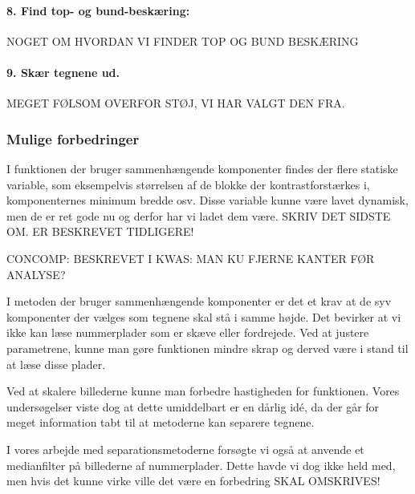 \paragraph{8. Find top- og bund-beskæring:}
NOGET OM HVORDAN VI FINDER TOP OG BUND BESKÆRING

\paragraph{9. Skær tegnene ud.}


MEGET FØLSOM OVERFOR STØJ, VI HAR VALGT DEN FRA.


\subsubsection{Mulige forbedringer}

I funktionen der bruger sammenhængende komponenter findes der flere statiske variable, som eksempelvis størrelsen af de blokke der kontrastforstærkes i, komponenternes minimum bredde osv. Disse variable kunne være lavet dynamisk, men de er ret gode nu og derfor har vi ladet dem være. SKRIV DET SIDSTE OM. ER BESKREVET TIDLIGERE!

CONCOMP: BESKREVET I KWAS: MAN KU FJERNE KANTER FØR ANALYSE?

I metoden der bruger sammenhængende komponenter er det et krav at de syv komponenter der vælges som tegnene skal stå i samme højde. Det bevirker at vi ikke kan læse nummerplader som er skæve eller fordrejede. Ved at justere parametrene, kunne man gøre funktionen mindre skrap og derved være i stand til at læse disse plader.

Ved at skalere billederne kunne man forbedre hastigheden for funktionen. Vores undersøgelser viste dog at dette umiddelbart er en dårlig idé, da der går for meget information tabt til at metoderne kan separere tegnene.

I vores arbejde med separationsmetoderne forsøgte vi også at anvende et medianfilter på billederne af nummerplader. Dette havde vi dog ikke held med, men hvis det kunne virke ville det være en forbedring SKAL OMSKRIVES!

